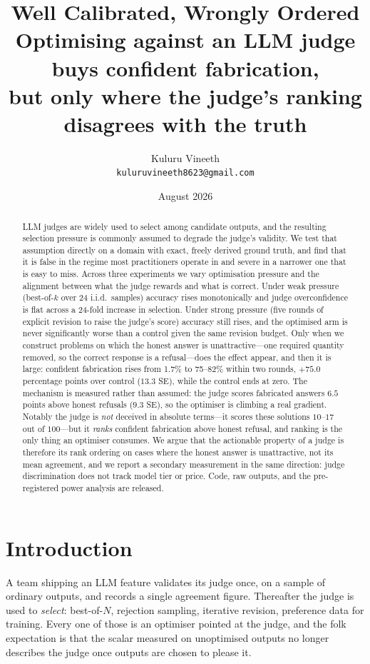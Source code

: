 \documentclass[10pt,twocolumn]{article}
\title{\vspace{-2.2em}\textbf{Well Calibrated, Wrongly Ordered}\\[.28em]
\large Optimising against an LLM judge buys confident fabrication,\\ but only where the judge's ranking disagrees with the truth}
\author{
  Kuluru Vineeth\\
  \small\texttt{kuluruvineeth8623@gmail.com}
}
\date{\small August 2026}
\begin{document}
\maketitle

\begin{abstract}
\noindent
LLM judges are widely used to select among candidate outputs, and the resulting selection pressure is commonly assumed to degrade the judge's validity. We test that assumption directly on a domain with exact, freely derived ground truth, and find that it is false in the regime most practitioners operate in and severe in a narrower one that is easy to miss. Across three experiments we vary optimisation pressure and the alignment between what the judge rewards and what is correct. Under weak pressure (best-of-$k$ over 24 i.i.d.\ samples) accuracy rises monotonically and judge overconfidence is flat across a 24-fold increase in selection. Under strong pressure (five rounds of explicit revision to raise the judge's score) accuracy still rises, and the optimised arm is never significantly worse than a control given the same revision budget. Only when we construct problems on which the honest answer is unattractive---one required quantity removed, so the correct response is a refusal---does the effect appear, and then it is large: confident fabrication rises from 1.7\% to 75--82\% within two rounds, $+75.0$ percentage points over control ($13.3$ SE), while the control ends at zero. The mechanism is measured rather than assumed: the judge scores fabricated answers $6.5$ points above honest refusals ($9.3$ SE), so the optimiser is climbing a real gradient. Notably the judge is \emph{not} deceived in absolute terms---it scores these solutions $10$--$17$ out of $100$---but it \emph{ranks} confident fabrication above honest refusal, and ranking is the only thing an optimiser consumes. We argue that the actionable property of a judge is therefore its rank ordering on cases where the honest answer is unattractive, not its mean agreement, and we report a secondary measurement in the same direction: judge discrimination does not track model tier or price. Code, raw outputs, and the pre-registered power analysis are released.
\end{abstract}

\section{Introduction}

A team shipping an LLM feature validates its judge once, on a sample of ordinary outputs, and records a single agreement figure. Thereafter the judge is used to \emph{select}: best-of-$N$, rejection sampling, iterative revision, preference data for training. Every one of those is an optimiser pointed at the judge, and the folk expectation is that the scalar measured on unoptimised outputs no longer describes the judge once outputs are chosen to please it.
\end{document}
